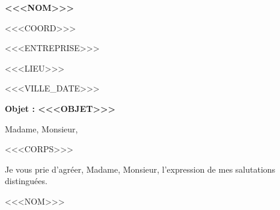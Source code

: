 \documentclass[11pt,a4paper]{article}
\begin{document}
\noindent
\begin{minipage}[t]{0.5\textwidth}
  \textbf{<<<NOM>>>}\par
  <<<COORD>>>
\end{minipage}%
\begin{minipage}[t]{0.5\textwidth}
  \raggedleft
  <<<ENTREPRISE>>>\par
  <<<LIEU>>>
\end{minipage}

\vspace{1.2em}
\noindent <<<VILLE_DATE>>>

\vspace{0.6em}
\noindent\textbf{Objet : <<<OBJET>>>}

\vspace{0.6em}
\noindent Madame, Monsieur,

<<<CORPS>>>

\noindent Je vous prie d'agréer, Madame, Monsieur, l'expression de mes salutations
distinguées.

\vspace{1.6em}
\noindent\hfill <<<NOM>>>
\end{document}

